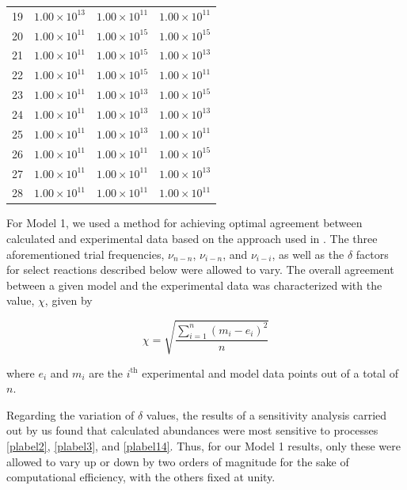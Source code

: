 \documentclass[journal=aesccq,manuscript=article,layout=twocolumn]{achemso}
\begin{document}
\begin{table}[p!]
\begin{tabular}{cccc}
19 & \(1.00 \times 10^{13}\) & \(1.00 \times 10^{11}\) & \(1.00 \times 10^{11}\) \\
20 & \(1.00 \times 10^{11}\) & \(1.00 \times 10^{15}\) & \(1.00 \times 10^{15}\) \\
21 & \(1.00 \times 10^{11}\) & \(1.00 \times 10^{15}\) & \(1.00 \times 10^{13}\) \\
22 & \(1.00 \times 10^{11}\) & \(1.00 \times 10^{15}\) & \(1.00 \times 10^{11}\) \\
23 & \(1.00 \times 10^{11}\) & \(1.00 \times 10^{13}\) & \(1.00 \times 10^{15}\) \\
24 & \(1.00 \times 10^{11}\) & \(1.00 \times 10^{13}\) & \(1.00 \times 10^{13}\) \\
25 & \(1.00 \times 10^{11}\) & \(1.00 \times 10^{13}\) & \(1.00 \times 10^{11}\) \\
26 & \(1.00 \times 10^{11}\) & \(1.00 \times 10^{11}\) & \(1.00 \times 10^{15}\) \\
27 & \(1.00 \times 10^{11}\) & \(1.00 \times 10^{11}\) & \(1.00 \times 10^{13}\) \\
28 & \(1.00 \times 10^{11}\) & \(1.00 \times 10^{11}\) & \(1.00 \times 10^{11}\) \\
    \hline
  \end{tabular}
\end{table}

For Model 1, we used a method for achieving optimal agreement between calculated and experimental data based on the approach used in \citet{mullikin_new_2021}. The three aforementioned trial frequencies, $\nu_{n-n}$, $\nu_{i-n}$, and $\nu_{i-i}$, as well as the $\delta$ factors for select reactions described below were allowed to vary. The overall agreement between a given model and the experimental data was characterized with the value, $\chi$, given by

\begin{equation}
    \chi = \sqrt{\frac{\sum_{i=1}^{n} (m_i - e_i)^2}{n}}
\end{equation}

\noindent
where $e_i$ and $m_i$ are the $i^{\textrm{th}}$ experimental and model data points out of a total of $n$.

Regarding the variation of $\delta$ values, the results of a sensitivity analysis carried out by us found that calculated  abundances were most sensitive to processes \ref{plabel2}, \ref{plabel3}, and \ref{plabel14}. Thus, for our Model 1 results, only these were allowed to vary up or down by two orders of magnitude for the sake of computational efficiency, with the others fixed at unity. 
\end{document}
